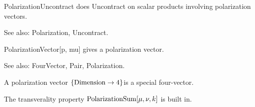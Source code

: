 





PolarizationUncontract does Uncontract on scalar products involving polarization vectors.

See also:  Polarization, Uncontract.



PolarizationVector[p, mu] gives a polarization vector.

See also: FourVector, Pair, Polarization.






A polarization vector \(\{\mathrm{Dimension}\rightarrow 4\}\)is a special four-vector.



The transverality property \(\mathrm{PolarizationSum}[\mu ,\nu ,k]\) is built in.




